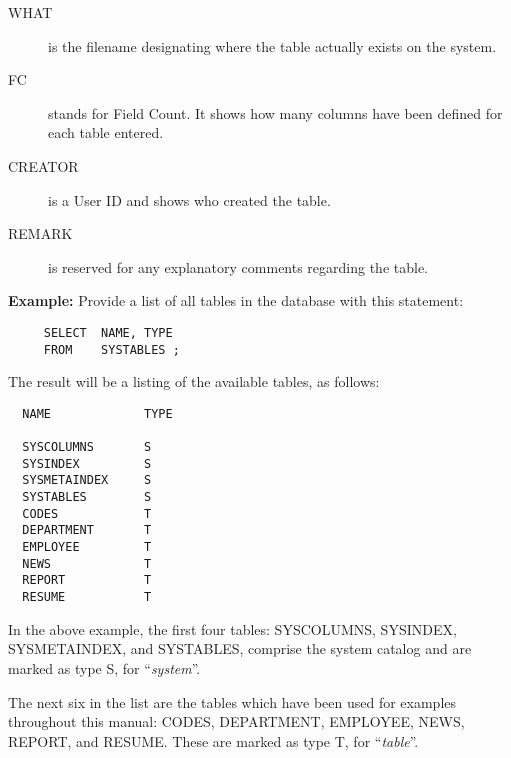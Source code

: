 \begin{description}
\begin{description}
\end{description}

\item[WHAT] is the filename designating where the table actually
exists on the system.

\item[FC] stands for Field Count.  It shows how many columns have been
defined for each table entered.

\item[CREATOR] is a User ID and shows who created the table.

\item[REMARK] is reserved for any explanatory comments regarding the
table.
\end{description}

{\bf Example:}
Provide a list of all tables in the database with this statement:

\begin{verbatim}
     SELECT  NAME, TYPE
     FROM    SYSTABLES ;
\end{verbatim}

The result will be a listing of the available tables, as follows:

\begin{screen}
\begin{verbatim}
  NAME             TYPE

  SYSCOLUMNS       S
  SYSINDEX         S
  SYSMETAINDEX     S
  SYSTABLES        S
  CODES            T
  DEPARTMENT       T
  EMPLOYEE         T
  NEWS             T
  REPORT           T
  RESUME           T
\end{verbatim}
\end{screen}

In the above example, the first four tables:  SYSCOLUMNS, SYSINDEX,
SYSMETAINDEX, and SYSTABLES, comprise the system catalog and are marked as
type S, for ``{\em system}''.

The next six in the list are the tables which have been used for examples
throughout this manual:  CODES, DEPARTMENT, EMPLOYEE, NEWS, REPORT, and
RESUME.  These are marked as type T, for ``{\em table}''.


